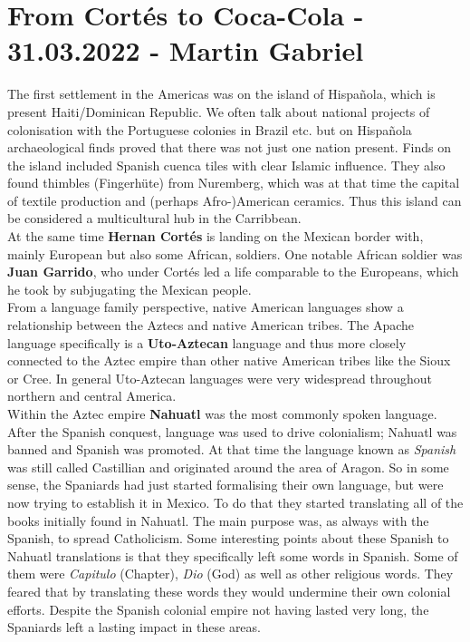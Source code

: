 \documentclass{article}
\begin{document}
	\section{From Cortés to Coca-Cola - 31.03.2022 - Martin Gabriel}

	The first settlement in the Americas was on the island of Hispañola, which is present Haiti/Dominican Republic. We often talk about national projects of colonisation with the Portuguese colonies in Brazil etc. but on Hispañola archaeological finds proved that there was not just one nation present. Finds on the island included Spanish cuenca tiles with clear Islamic influence. They also found thimbles (Fingerhüte) from Nuremberg, which was at that time the capital of textile production and (perhaps Afro-)American ceramics. Thus this island can be considered a multicultural hub in the Carribbean. \\
	At the same time \textbf{Hernan Cortés} is landing on the Mexican border with, mainly European but also some African, soldiers. One notable African soldier was \textbf{Juan Garrido}, who under Cortés led a life comparable to the Europeans, which he took by subjugating the Mexican people. \\
	From a language family perspective, native American languages show a relationship between the Aztecs and native American tribes. The Apache language specifically is a \textbf{Uto-Aztecan} language and thus more closely connected to the Aztec empire than other native American tribes like the Sioux or Cree. In general Uto-Aztecan languages were very widespread throughout northern and central America. \\
	Within the Aztec empire \textbf{Nahuatl} was the most commonly spoken language. After the Spanish conquest, language was used to drive colonialism; Nahuatl was banned and Spanish was promoted. At that time the language known as \textit{Spanish} was still called Castillian and originated around the area of Aragon. So in some sense, the Spaniards had just started formalising their own language, but were now trying to establish it in Mexico. To do that they started translating all of the books initially found in Nahuatl. The main purpose was, as always with the Spanish, to spread Catholicism. Some interesting points about these Spanish to Nahuatl translations is that they specifically left some words in Spanish. Some of them were \textit{Capitulo} (Chapter), \textit{Dio} (God) as well as other religious words. They feared that by translating these words they would undermine their own colonial efforts. Despite the Spanish colonial empire not having lasted very long, the Spaniards left a lasting impact in these areas. \\
\end{document}
